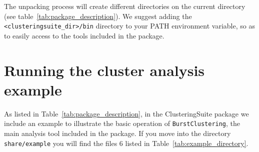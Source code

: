 \documentclass[twoside,a4,english,11pt]{book}
\begin{document}
The unpacking process will create different directories on the current directory
(see table~\ref{tab:package_description}). We suggest adding the 
\texttt{<clusteringsuite\_dir>/bin} directory to your PATH environment variable,
so as to easily access to the tools included in the package.

\begin{table}[!ht]
\centering
  
  \caption{Package contents description}
  \label{tab:package_description}
  

\end{table}

\section{Running the cluster analysis example}

As listed in Table~\ref{tab:package_description}, in the \textsf{ClusteringSuite}
package we include an example to illustrate the basic operation of 
\texttt{BurstClustering}, the main analysis tool included in the package.
If you move into the directory \texttt{share/example} you will find the
files 6 listed in Table~\ref{tab:example_directory}.
\end{document}
